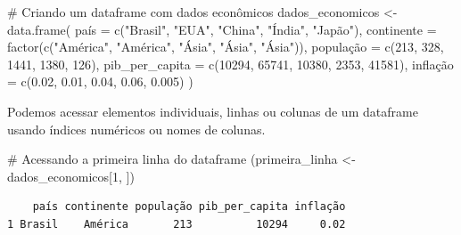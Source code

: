 \documentclass[
  portuguese,
  letterpaper,
  DIV=11,
  numbers=noendperiod]{scrreprt}
\newenvironment{Shaded}{\begin{snugshade}}{\end{snugshade}}
\newcommand{\AttributeTok}[1]{\textcolor[rgb]{0.40,0.45,0.13}{#1}}
\newcommand{\CommentTok}[1]{\textcolor[rgb]{0.37,0.37,0.37}{#1}}
\newcommand{\DecValTok}[1]{\textcolor[rgb]{0.68,0.00,0.00}{#1}}
\newcommand{\FloatTok}[1]{\textcolor[rgb]{0.68,0.00,0.00}{#1}}
\newcommand{\FunctionTok}[1]{\textcolor[rgb]{0.28,0.35,0.67}{#1}}
\newcommand{\NormalTok}[1]{\textcolor[rgb]{0.00,0.23,0.31}{#1}}
\newcommand{\OtherTok}[1]{\textcolor[rgb]{0.00,0.23,0.31}{#1}}
\newcommand{\SpecialCharTok}[1]{\textcolor[rgb]{0.37,0.37,0.37}{#1}}
\newcommand{\StringTok}[1]{\textcolor[rgb]{0.13,0.47,0.30}{#1}}
\theoremstyle{definition}
\theoremstyle{remark}
\begin{document}
\begin{Shaded}
\begin{Highlighting}[]
\CommentTok{\# Criando um dataframe com dados econômicos}
\NormalTok{dados\_economicos }\OtherTok{\textless{}{-}} \FunctionTok{data.frame}\NormalTok{(}
\NormalTok{  país }\OtherTok{=} \FunctionTok{c}\NormalTok{(}\StringTok{"Brasil"}\NormalTok{, }\StringTok{"EUA"}\NormalTok{, }\StringTok{"China"}\NormalTok{, }\StringTok{"Índia"}\NormalTok{, }\StringTok{"Japão"}\NormalTok{),}
  \AttributeTok{continente =} \FunctionTok{factor}\NormalTok{(}\FunctionTok{c}\NormalTok{(}\StringTok{"América"}\NormalTok{, }\StringTok{"América"}\NormalTok{, }\StringTok{"Ásia"}\NormalTok{, }\StringTok{"Ásia"}\NormalTok{, }\StringTok{"Ásia"}\NormalTok{)),}
\NormalTok{  população }\OtherTok{=} \FunctionTok{c}\NormalTok{(}\DecValTok{213}\NormalTok{, }\DecValTok{328}\NormalTok{, }\DecValTok{1441}\NormalTok{, }\DecValTok{1380}\NormalTok{, }\DecValTok{126}\NormalTok{),}
  \AttributeTok{pib\_per\_capita =} \FunctionTok{c}\NormalTok{(}\DecValTok{10294}\NormalTok{, }\DecValTok{65741}\NormalTok{, }\DecValTok{10380}\NormalTok{, }\DecValTok{2353}\NormalTok{, }\DecValTok{41581}\NormalTok{),}
\NormalTok{  inflação }\OtherTok{=} \FunctionTok{c}\NormalTok{(}\FloatTok{0.02}\NormalTok{, }\FloatTok{0.01}\NormalTok{, }\FloatTok{0.04}\NormalTok{, }\FloatTok{0.06}\NormalTok{, }\FloatTok{0.005}\NormalTok{)}
\NormalTok{)}
\end{Highlighting}
\end{Shaded}

Podemos acessar elementos individuais, linhas ou colunas de um dataframe
usando índices numéricos ou nomes de colunas.

\begin{Shaded}
\begin{Highlighting}[]
\CommentTok{\# Acessando a primeira linha do dataframe}
\NormalTok{(primeira\_linha }\OtherTok{\textless{}{-}}\NormalTok{ dados\_economicos[}\DecValTok{1}\NormalTok{, ])}
\end{Highlighting}
\end{Shaded}

\begin{verbatim}
    país continente população pib_per_capita inflação
1 Brasil    América       213          10294     0.02
\end{verbatim}

\begin{Shaded}
\end{Shaded}
\end{document}

